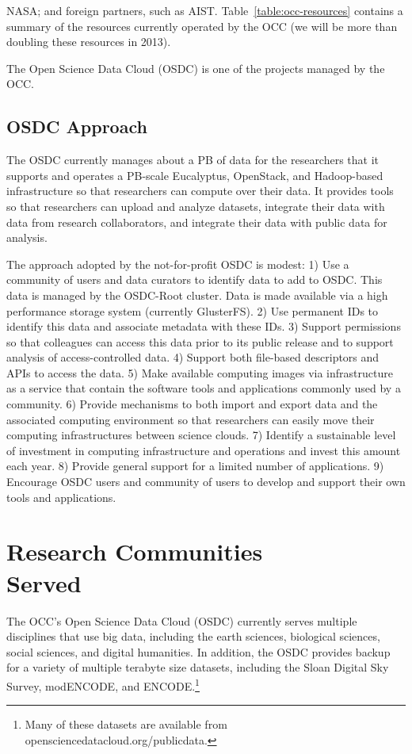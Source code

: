 \documentclass[11pt,twocolumn]{article}
\begin{document}
NASA; and foreign partners, such as
AIST. Table~\ref{table:occ-resources} contains a summary of the
resources currently  operated by the OCC (we will be more than
doubling these resources in 2013).

The Open Science Data Cloud (OSDC) is one of the projects managed
by the OCC.  

\subsection{OSDC Approach}  The OSDC currently manages about a PB of data
for the researchers that it supports and operates a PB-scale Eucalyptus,
OpenStack, and Hadoop-based infrastructure so that researchers can
compute over their data.  It provides tools so that researchers can
upload and analyze datasets, integrate their data with data from
research collaborators, and integrate their data with public data for
analysis.

The approach adopted by the not-for-profit OSDC is modest: 
1) Use a community of users and data
curators to identify data to add to OSDC.  This data is managed by
the OSDC-Root cluster. Data is made available via a high
performance storage system (currently GlusterFS).  2) Use permanent
IDs to identify this data and associate metadata with these IDs.  3)
Support permissions so that colleagues can access this data
prior to its public release and to support analysis of access-controlled data.  
4) Support both file-based descriptors and
APIs to access the data.  5) Make available computing images
via infrastructure as a service that contain the software tools and
applications commonly used by a community.  6) Provide mechanisms to
both import and export data and the associated computing environment
so that researchers can easily move their computing
infrastructures between science clouds.  7) Identify a sustainable
level of investment in computing infrastructure and operations and
invest this amount each year.  8) Provide general support for a
limited number of applications.   9) Encourage OSDC users and community of users to
develop and support their own tools and applications.  

\section{Research Communities\protect\\ 
Served}
\label{section:disciplines}

The OCC's Open Science Data Cloud (OSDC) currently serves
multiple disciplines that use big data, including the earth sciences,
biological sciences,  social sciences, and digital humanities.  In
addition, the OSDC provides backup for a variety of multiple terabyte
size datasets, including the Sloan Digital Sky Survey, modENCODE,
and ENCODE.\footnote{Many of these datasets are available from
opensciencedatacloud.org/publicdata.}
\end{document}
